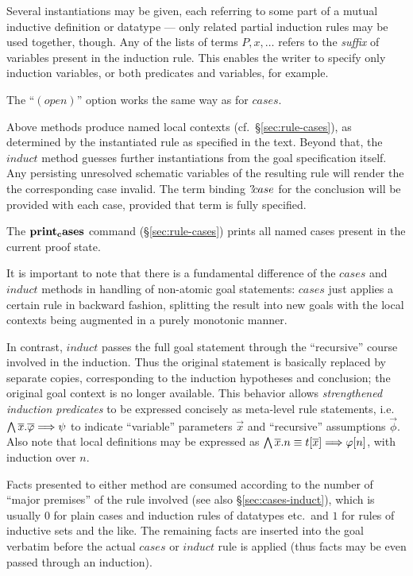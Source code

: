 \begin{descr}
  Several instantiations may be given, each referring to some part of a mutual
  inductive definition or datatype --- only related partial induction rules
  may be used together, though.  Any of the lists of terms $P, x, \dots$
  refers to the \emph{suffix} of variables present in the induction rule.
  This enables the writer to specify only induction variables, or both
  predicates and variables, for example.

  The ``$(open)$'' option works the same way as for $cases$.

\end{descr}

Above methods produce named local contexts (cf.\ \S\ref{sec:rule-cases}), as
determined by the instantiated rule as specified in the text.  Beyond that,
the $induct$ method guesses further instantiations from the goal specification
itself.  Any persisting unresolved schematic variables of the resulting rule
will render the the corresponding case invalid.  The term binding
${?\!case}$ for the conclusion will be provided with each
case, provided that term is fully specified.

The ${\mathord{\mathbf{print_cases}}}$ command (\S\ref{sec:rule-cases}) prints all
named cases present in the current proof state.

\medskip

It is important to note that there is a fundamental difference of the $cases$
and $induct$ methods in handling of non-atomic goal statements: $cases$ just
applies a certain rule in backward fashion, splitting the result into new
goals with the local contexts being augmented in a purely monotonic manner.

In contrast, $induct$ passes the full goal statement through the ``recursive''
course involved in the induction.  Thus the original statement is basically
replaced by separate copies, corresponding to the induction hypotheses and
conclusion; the original goal context is no longer available.  This behavior
allows \emph{strengthened induction predicates} to be expressed concisely as
meta-level rule statements, i.e.\ $\bigwedge\overline{x}. \overline{\varphi} \Longrightarrow \psi$ to
indicate ``variable'' parameters $\vec x$ and ``recursive'' assumptions
$\vec\phi$.  Also note that local definitions may be expressed as $\bigwedge\overline{x}. n \equiv t[\overline{x}] \Longrightarrow \varphi[n]$, with induction over $n$.

\medskip

Facts presented to either method are consumed according to the number of
``major premises'' of the rule involved (see also \S\ref{sec:cases-induct}),
which is usually $0$ for plain cases and induction rules of datatypes etc.\
and $1$ for rules of inductive sets and the like.  The remaining facts are
inserted into the goal verbatim before the actual $cases$ or $induct$ rule is
applied (thus facts may be even passed through an induction).



